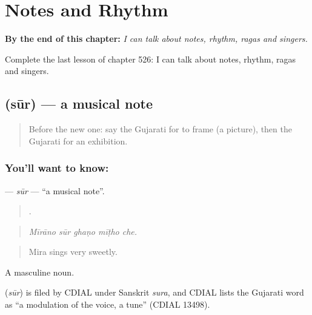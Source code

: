 
\chapter{Notes and Rhythm}
\label{ch:gu-notes-and-rhythm}

\begin{chapteropening}
\textbf{By the end of this chapter:} \emph{I can talk about notes, rhythm, ragas and singers.}

Complete the last lesson of chapter 526: I can talk about notes, rhythm, ragas and singers.
\end{chapteropening}

\section[\texorpdfstring{\gu{સૂર} (sūr)}{સૂર (sūr)}]{ (sūr) — a musical note}

\label{lesson:GU-C526-sur}



\begin{quote}
Before the new one: say the Gujarati for to frame (a picture), then the Gujarati for an exhibition.
\end{quote}

\subsection*{You'll want to know: }
\textbf{} — \emph{sūr} — \textquotedblleft{}a musical note\textquotedblright{}.

\begin{quote}
    .
\end{quote}

\begin{quote}
\emph{Mīrāno sūr ghaṇo mīṭho che.}
\end{quote}

\begin{quote}
Mira sings very sweetly.
\end{quote}

A masculine noun.

\begin{cousinweb}
\textbf{} (\emph{sūr}) is filed by CDIAL under Sanskrit \emph{sura}, and CDIAL lists the Gujarati word as \textquotedblleft{}a modulation of the voice, a tune\textquotedblright{} (CDIAL 13498).
\end{cousinweb}

